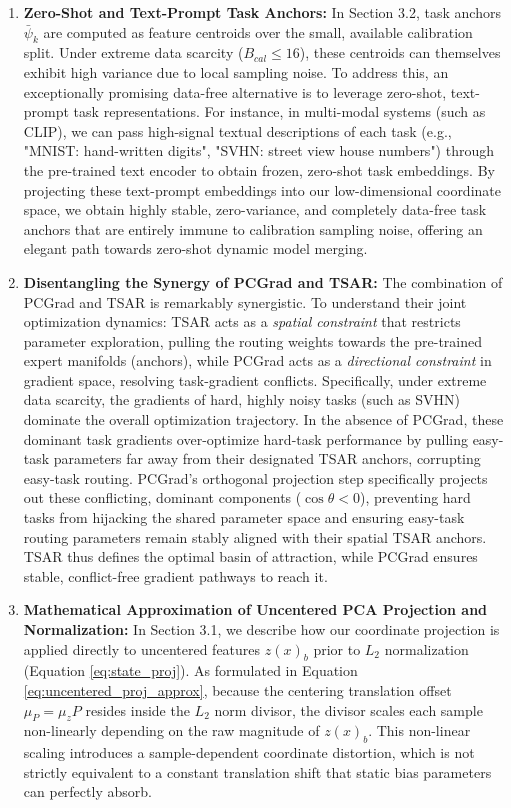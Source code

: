 \begin{enumerate}
    \item \textbf{Zero-Shot and Text-Prompt Task Anchors:}
    In Section 3.2, task anchors $\bar{\psi}_k$ are computed as feature centroids over the small, available calibration split. Under extreme data scarcity ($B_{cal} \le 16$), these centroids can themselves exhibit high variance due to local sampling noise. To address this, an exceptionally promising data-free alternative is to leverage zero-shot, text-prompt task representations. For instance, in multi-modal systems (such as CLIP), we can pass high-signal textual descriptions of each task (e.g., "MNIST: hand-written digits", "SVHN: street view house numbers") through the pre-trained text encoder to obtain frozen, zero-shot task embeddings. By projecting these text-prompt embeddings into our low-dimensional coordinate space, we obtain highly stable, zero-variance, and completely data-free task anchors that are entirely immune to calibration sampling noise, offering an elegant path towards zero-shot dynamic model merging.

    \item \textbf{Disentangling the Synergy of PCGrad and TSAR:}
    The combination of PCGrad and TSAR is remarkably synergistic. To understand their joint optimization dynamics: TSAR acts as a \emph{spatial constraint} that restricts parameter exploration, pulling the routing weights towards the pre-trained expert manifolds (anchors), while PCGrad acts as a \emph{directional constraint} in gradient space, resolving task-gradient conflicts. Specifically, under extreme data scarcity, the gradients of hard, highly noisy tasks (such as SVHN) dominate the overall optimization trajectory. In the absence of PCGrad, these dominant task gradients over-optimize hard-task performance by pulling easy-task parameters far away from their designated TSAR anchors, corrupting easy-task routing. PCGrad's orthogonal projection step specifically projects out these conflicting, dominant components ($\cos\theta < 0$), preventing hard tasks from hijacking the shared parameter space and ensuring easy-task routing parameters remain stably aligned with their spatial TSAR anchors. TSAR thus defines the optimal basin of attraction, while PCGrad ensures stable, conflict-free gradient pathways to reach it.

    \item \textbf{Mathematical Approximation of Uncentered PCA Projection and Normalization:}
    In Section 3.1, we describe how our coordinate projection is applied directly to uncentered features $z(x)_b$ prior to $L_2$ normalization (Equation \ref{eq:state_proj}). As formulated in Equation \ref{eq:uncentered_proj_approx}, because the centering translation offset $\mu_P = \mu_z P$ resides inside the $L_2$ norm divisor, the divisor scales each sample non-linearly depending on the raw magnitude of $z(x)_b$. This non-linear scaling introduces a sample-dependent coordinate distortion, which is not strictly equivalent to a constant translation shift that static bias parameters can perfectly absorb.
    

\end{enumerate}
